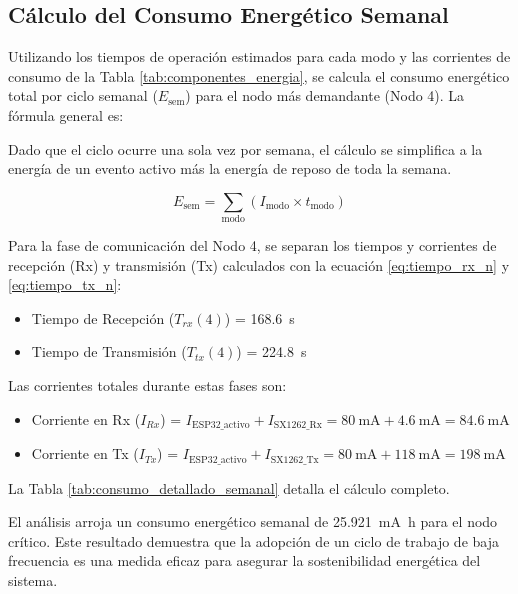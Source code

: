 \subsection*{Cálculo del Consumo Energético Semanal}
\label{subsec:calculo_consumo}

Utilizando los tiempos de operación estimados para cada modo y las corrientes de consumo de la Tabla \ref{tab:componentes_energia}, se calcula el consumo energético total por ciclo semanal ($E_{\text{sem}}$) para el nodo más demandante (Nodo 4). La fórmula general es:

Dado que el ciclo ocurre una sola vez por semana, el cálculo se simplifica a la energía de un evento activo más la energía de reposo de toda la semana.

\begin{equation} \label{eq:energia_semanal}
E_{\text{sem}} = \sum_{\text{modo}} (I_{\text{modo}} \times t_{\text{modo}})
\end{equation}

Para la fase de comunicación del Nodo 4, se separan los tiempos y corrientes de recepción (Rx) y transmisión (Tx) calculados con la ecuación \eqref{eq:tiempo_rx_n} y \eqref{eq:tiempo_tx_n}:
\begin{itemize}
    \item Tiempo de Recepción ($T_{rx}(4)$) = \SI{168.6}{\second}
    \item Tiempo de Transmisión ($T_{tx}(4)$) = \SI{224.8}{\second}
\end{itemize}
Las corrientes totales durante estas fases son:
\begin{itemize}
    \item Corriente en Rx ($I_{Rx}$) = $I_{\text{ESP32\_activo}} + I_{\text{SX1262\_Rx}} = \SI{80}{\milli\ampere} + \SI{4.6}{\milli\ampere} = \SI{84.6}{\milli\ampere}$
    \item Corriente en Tx ($I_{Tx}$) = $I_{\text{ESP32\_activo}} + I_{\text{SX1262\_Tx}} = \SI{80}{\milli\ampere} + \SI{118}{\milli\ampere} = \SI{198}{\milli\ampere}$
\end{itemize}

La Tabla \ref{tab:consumo_detallado_semanal} detalla el cálculo completo.




El análisis arroja un consumo energético semanal de \SI{25.921}{\milli\ampere\hour} para el nodo crítico. Este resultado demuestra que la adopción de un ciclo de trabajo de baja frecuencia es una medida eficaz para asegurar la sostenibilidad energética del sistema.

